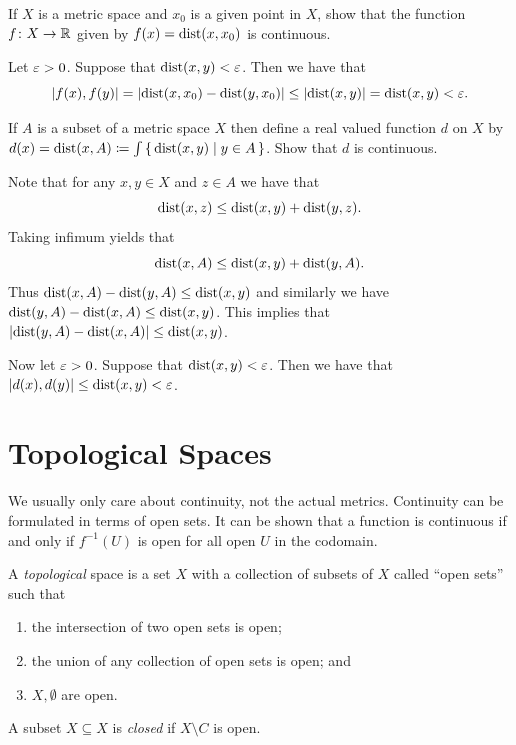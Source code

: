 \documentclass[letterpaper, 11pt, oneside]{book}
\begin{document}
\begin{exercise}
  If $X$ is a metric space and $x_{0}$ is a given point in $X$, show that the function $f\colon X \to \mathbb{R}$ given by $f(x) = \operatorname{dist}(x, x_{0})$ is continuous.
\end{exercise}
\begin{pf}
  Let $\varepsilon > 0$.
  Suppose that $\operatorname{dist}(x, y) < \varepsilon$.
  Then we have that
  \[
    \abs{f(x), f(y)} = \abs{\operatorname{dist}(x, x_{0}) - \operatorname{dist}(y, x_{0})} \leq \abs{\operatorname{dist}(x, y)} = \operatorname{dist}(x, y) < \varepsilon.
  \]
\end{pf}

\begin{exercise}
  If $A$ is a subset of a metric space $X$ then define a real valued function $d$ on $X$ by $d(x) = \operatorname{dist}(x, A) \coloneqq \int\set{\operatorname{dist}(x, y) | y \in A}$.
  Show that $d$ is continuous.
\end{exercise}
\begin{pf}
  Note that for any $x, y \in X$ and $z \in A$ we have that
  \[
    \operatorname{dist}(x, z) \leq \operatorname{dist}(x, y) + \operatorname{dist}(y, z).
  \]
  Taking infimum yields that
  \[
    \operatorname{dist}(x, A) \leq \operatorname{dist}(x, y) + \operatorname{dist}(y, A).
  \]
  Thus $\operatorname{dist}(x, A) - \operatorname{dist}(y, A) \leq \operatorname{dist}(x, y)$ and similarly we have $\operatorname{dist}(y, A) - \operatorname{dist}(x, A) \leq \operatorname{dist}(x, y)$.
  This implies that $\abs{\operatorname{dist}(y, A) - \operatorname{dist}(x, A)} \leq \operatorname{dist}(x, y)$.

  Now let $\varepsilon > 0$.
  Suppose that $\operatorname{dist}(x, y) < \varepsilon$.
  Then we have that $\abs{d(x), d(y)} \leq \operatorname{dist}(x, y) < \varepsilon$.
\end{pf}

\clearpage

\chapter{Topological Spaces}

We usually only care about continuity, not the actual metrics.
Continuity can be formulated in terms of open sets.
It can be shown that a function is continuous if and only if $f^{-1}(U)$ is open for all open $U$ in the codomain.

\begin{defn}
  A \emph{topological} space is a set $X$ with a collection of subsets of $X$ called ``open sets'' such that
  \begin{enumerate}
  \item the intersection of two open sets is open;
  \item the union of any collection of open sets is open; and
  \item $X, \emptyset$ are open.
  \end{enumerate}
  A subset $X \subseteq X$ is \emph{closed} if $X \setminus C$ is open.
\end{defn}
\end{document}
